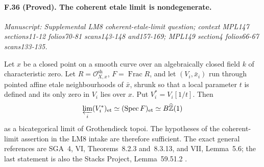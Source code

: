 \paragraph{F.36 (Proved). The coherent etale limit is nondegenerate.}
\textit{Manuscript: Supplemental LM8 coherent-etale-limit question; context MPL147 sections11-12 folios70-81 scans143-148 and157-169; MPL149 section4 folios66-67 scans133-135.}

Let $x$ be a closed point on a smooth curve over an algebraically closed
field $k$ of characteristic zero. Let $R=\mathcal O_{X,x}^{\mathrm{sh}}$,
$F=\operatorname{Frac}R$, and let $(V_i,\bar x_i)$ run through pointed
affine etale neighbourhoods of $\bar x$, shrunk so that a local parameter
$t$ is defined and its only zero in $V_i$ lies over $x$. Put
$V_i^*=V_i[1/t]$. Then
\[
 \varprojlim_i (V_i^*)_{\mathrm{et}}
   \simeq (\operatorname{Spec}F)_{\mathrm{et}}
   \simeq B\widehat{\mathbb Z}(1)
\]
as a bicategorical limit of Grothendieck topoi. The hypotheses of the
coherent-limit assertion in the LM8 intake are therefore sufficient.
The exact general references are SGA~4, VI, Theorems~8.2.3 and~8.3.13,
and VII, Lemma~5.6; the last statement is also the Stacks Project,
Lemma~59.51.2 \citep{SGA4II,StacksEtaleLimits}.

